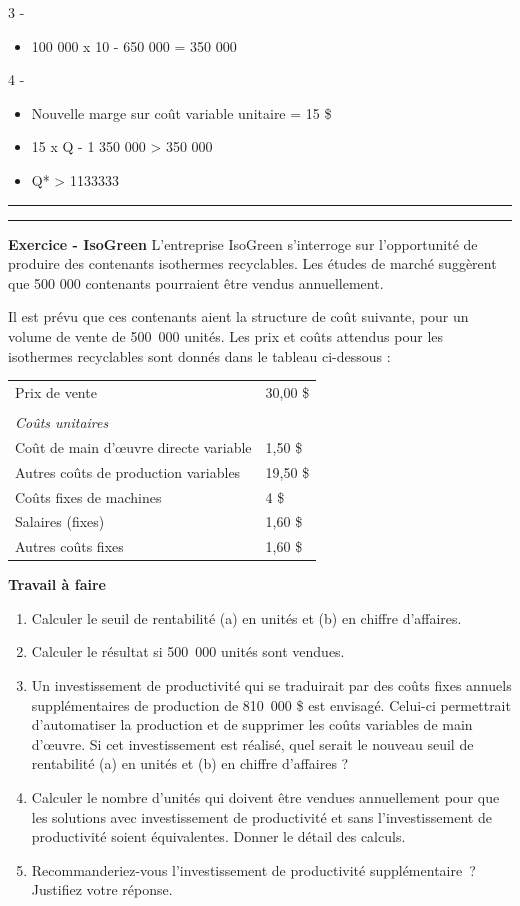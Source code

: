 \documentclass[oneside]{kaobook}
\begin{document}
3 -
\begin{itemize}
\item 100 000 x 10 - 650 000 = 350 000
\end{itemize}

4 -
\begin{itemize}
\item Nouvelle marge sur coût variable unitaire = 15 \$
\item 15 x Q - 1 350 000 > 350 000
\item Q* > 1133333
\end{itemize}

\noindent\rule{\textwidth}{0.5pt}

\noindent\rule{\textwidth}{0.5pt}
\textbf{Exercice - IsoGreen}
L'entreprise IsoGreen s’interroge sur l’opportunité de produire des contenants isothermes recyclables. Les études de marché suggèrent que 500 000 contenants pourraient être vendus annuellement. 

Il est prévu que ces contenants aient la structure de coût suivante, pour un volume de vente de 500 000 unités. Les prix et coûts attendus pour les isothermes recyclables sont donnés dans le tableau ci-dessous :

\begin{center}
\begin{tabular}{ll}
Prix de vente & 30,00 \$\\
 & \\
\emph{Coûts unitaires} & \\
Coût de main d’œuvre directe variable & 1,50 \$\\
Autres coûts de production variables & 19,50 \$\\
Coûts fixes de machines & 4 \$\\
Salaires (fixes) & 1,60 \$\\
Autres coûts fixes & 1,60 \$\\
\end{tabular}
\end{center}

\textbf{Travail à faire}
\begin{enumerate}
\item Calculer le seuil de rentabilité (a) en unités et (b) en chiffre d’affaires.
\item Calculer le résultat si 500 000 unités sont vendues.
\item Un investissement de productivité qui se traduirait par des coûts fixes annuels supplémentaires de production de 810 000 \$ est envisagé. Celui-ci permettrait d’automatiser la production et de supprimer les coûts variables de main d’œuvre. Si cet investissement est réalisé, quel serait le nouveau seuil de rentabilité (a) en unités et (b) en chiffre d’affaires ?
\item Calculer le nombre d’unités qui doivent être vendues annuellement pour que les solutions avec investissement de productivité et sans l’investissement de productivité soient équivalentes. Donner le détail des calculs.
\item Recommanderiez-vous l’investissement de productivité supplémentaire ? Justifiez votre réponse.
\end{enumerate}
\end{document}
